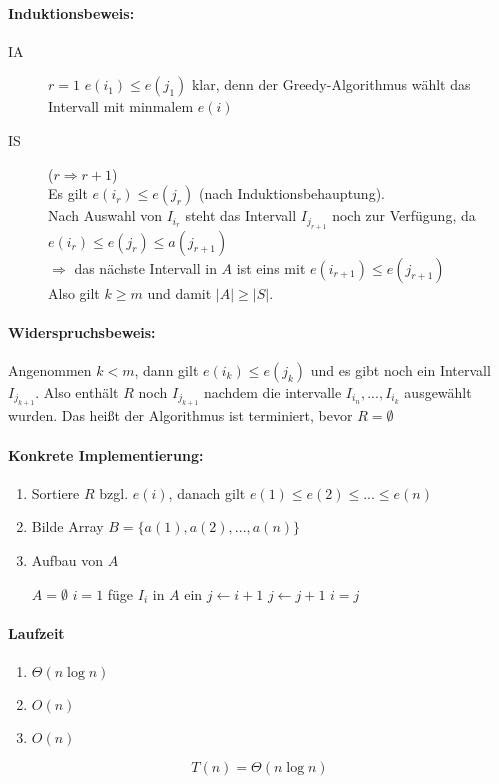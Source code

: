 \paragraph{Induktionsbeweis:}
\begin{description}
 \item[IA] $r = 1$ $e(i_1) \leq e(j_1)$ klar, denn der Greedy-Algorithmus wählt das Intervall mit minmalem $e(i)$
 \item[IS] ($r \Rightarrow r + 1$)\\
     Es gilt $e(i_r) \leq e(j_r)$ (nach Induktionsbehauptung).\\
     Nach Auswahl von $I_{i_r}$ steht das Intervall $I_{j_{r+1}}$ noch zur Verfügung, da $e(i_r) \leq e(j_r) \leq a(j_{r+1})$\\
     $\Rightarrow$ das nächste Intervall in $A$ ist eins mit $e(i_{r+1}) \leq e(j_{r+1})$ \hfill \carsten\\
     Also gilt $k \geq m$ und damit $|A| \geq |S|$.
\end{description}

\paragraph*{Widerspruchsbeweis:} Angenommen $k < m$, dann gilt $e(i_k) \leq e(j_k)$ und es gibt noch ein Intervall $I_{j_{k+1}}$. Also enthält $R$ noch $I_{j_{k+1}}$ nachdem die intervalle $I_{i_n},...,I_{i_k}$ ausgewählt wurden. Das heißt der Algorithmus ist terminiert, bevor $R = \emptyset$

\paragraph*{Konkrete Implementierung:}
\begin{enumerate}
 \item Sortiere $R$ bzgl. $e(i)$, danach gilt $e(1) \leq e(2) \leq ... \leq e(n)$
 \item Bilde Array $B = \{a(1), a(2), ..., a(n)\}$
 \item Aufbau von $A$
 \begin{algorithmic}
  \STATE $A = \emptyset$
  \STATE $i = 1$
  \STATE füge $I_i$ in $A$ ein
  \STATE $j \gets i + 1$
  \STATE $j \gets j+1$
  \ENDWHILE
  \STATE $i = j$
  \ENDWHILE
 \end{algorithmic}
\end{enumerate}

\paragraph*{Laufzeit}
\begin{enumerate}
 \item $\Theta(n \log n)$
 \item $O(n)$
 \item $O(n)$
\end{enumerate}
\[T(n) = \Theta(n \log n)\]

